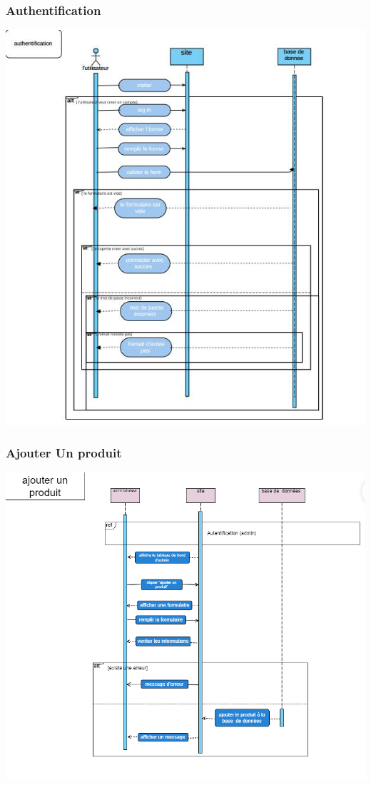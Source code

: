 \documentclass[a4paper,12pt,oneside]{article}
\begin{document}
{\newpage
\subsubsection{Authentification}
\vskip2cm
		\begin{center}
  		\includegraphics[width=1\textwidth]{Authentification}
		\end{center}

\newpage
\subsubsection{Ajouter Un produit }
\vskip2cm
		\begin{center}
  		\includegraphics[width=1\textwidth]{Ajouter Un produit}
		\end{center}
		
}
\end{document}
